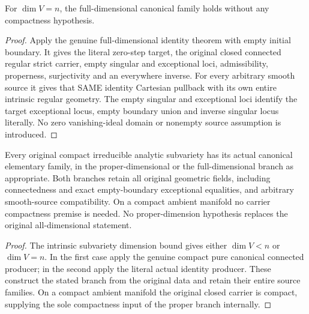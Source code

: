 \begin{theorem}
\label{hir:original-canonical-irreducible-full-identity}
\leanok
For $\dim V=n$, the full-dimensional canonical family holds without
any compactness hypothesis.
\end{theorem}
\begin{proof}
Apply the genuine full-dimensional identity theorem with empty initial
boundary. It gives the literal zero-step target, the original closed
connected regular strict carrier, empty singular and exceptional loci,
admissibility, properness, surjectivity and an everywhere inverse.
For every arbitrary smooth source it gives that SAME identity
Cartesian pullback with its own entire intrinsic regular geometry.
The empty singular and exceptional loci identify the target
exceptional locus, empty boundary union and inverse singular locus
literally. No zero vanishing-ideal domain or nonempty source
assumption is introduced.
\end{proof}

\begin{theorem}
\label{hir:original-canonical-irreducible-all-dimensions}
\leanok
Every original compact irreducible analytic subvariety has its actual
canonical elementary family, in the proper-dimensional or the
full-dimensional branch as appropriate. Both branches retain all
original geometric fields, including connectedness and exact
empty-boundary exceptional equalities, and arbitrary smooth-source
compatibility. On a compact ambient manifold no carrier compactness
premise is needed. No proper-dimension hypothesis replaces the
original all-dimensional statement.
\end{theorem}
\begin{proof}
The intrinsic subvariety dimension bound gives either $\dim V<n$
or $\dim V=n$. In the first case apply the genuine compact pure
canonical connected producer; in the second apply the literal actual
identity producer. These construct the stated branch from the original
data and retain their entire source families. On a compact ambient
manifold the original closed carrier is compact, supplying the sole
compactness input of the proper branch internally.
\end{proof}
